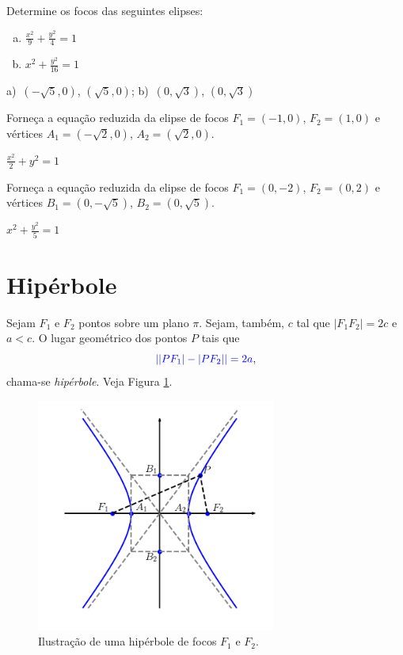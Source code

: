 \begin{exer}
  Determine os focos das seguintes elipses:
  \begin{enumerate}[a)]
  \item $\displaystyle \frac{x^2}{9} + \frac{y^2}{4} = 1$
  \item $\displaystyle x^2 + \frac{y^2}{16} = 1$
  \end{enumerate}
\end{exer}
\begin{resp}
  a)~$(-\sqrt{5}, 0)$, $(\sqrt{5}, 0)$; b)~$(0, \sqrt{3})$, $(0, \sqrt{3})$
\end{resp}

\begin{exer}
  Forneça a equação reduzida da elipse de focos $F_1=(-1, 0)$, $F_2=(1, 0)$ e vértices $A_1=(-\sqrt{2}, 0)$, $A_2=(\sqrt{2}, 0)$.
\end{exer}
\begin{resp}
  $\displaystyle\frac{x^2}{2}+y^2=1$
\end{resp}

\begin{exer}
  Forneça a equação reduzida da elipse de focos $F_1=(0, -2)$, $F_2=(0, 2)$ e vértices $B_1=(0, -\sqrt{5})$, $B_2=(0, \sqrt{5})$.
\end{exer}
\begin{resp}
  $\displaystyle x^2+\frac{y^2}{5}=1$
\end{resp}

\section{Hipérbole}\label{cap_conicas_sec_hiperbole}

Sejam $F_1$ e $F_2$ pontos sobre um plano $\pi$. Sejam, também, $c$ tal que $|F_1F_2|=2c$ e $a<c$. O lugar geométrico dos pontos $P$ tais que
\begin{equation}
  {\color{blue}||PF_1|-|PF_2||=2a},
\end{equation}
chama-se \emph{hipérbole}. Veja Figura \ref{fig:hiperbole}.

\begin{figure}[H]
  \centering
  \includegraphics[width=0.7\textwidth]{./cap_conicas/dados/fig_hiperbole/fig_hiperbole}
  \caption{Ilustração de uma hipérbole de focos $F_1$ e $F_2$.}
  \label{fig:hiperbole}
\end{figure}

